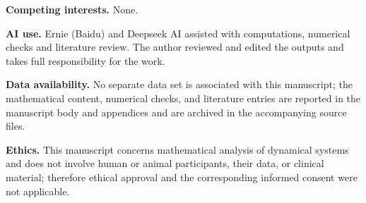 \documentclass[11pt,a4paper]{article}
\theoremstyle{plain}
\theoremstyle{definition}
\theoremstyle{remark}
\numberwithin{equation}{section}
\numberwithin{figure}{section}
\begin{document}
\textbf{Competing interests.} None.

\textbf{AI use.} Ernie (Baidu) and Deepseek AI assisted with computations, numerical checks and literature review. The author reviewed and edited the outputs and takes full responsibility for the work.

\textbf{Data availability.} No separate data set is associated with this manuscript; the mathematical content, numerical checks, and literature entries are reported in the manuscript body and appendices and are archived in the accompanying source files.

\textbf{Ethics.} This manuscript concerns mathematical analysis of dynamical systems and does not involve human or animal participants, their data, or clinical material; therefore ethical approval and the corresponding informed consent were not applicable.
\end{document}
